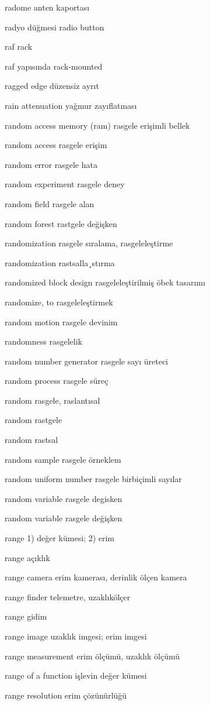 \documentclass[12pt,fleqn]{article}\usepackage{../../common}
\begin{document}
radome anten kaportası

radyo düğmesi radio button

raf rack

raf yapısında rack-mounted

ragged edge düzensiz ayrıt

rain attenuation yağmur zayıflatması

random access memory (ram) rasgele erişimli bellek

random access rasgele erişim

random error rasgele hata

random experiment rasgele deney

random field rasgele alan

random forest rastgele değişken

randomization rasgele sıralama, rasgeleleştirme

randomization rastsalla¸stırma

randomized block design rasgeleleştirilmiş öbek tasarımı

randomize, to rasgeleleştirmek

random motion rasgele devinim

randomness rasgelelik

random number generator rasgele sayı üreteci

random process rasgele süreç

random rasgele, raslantısal

random rastgele

random rastsal

random sample rasgele örneklem

random uniform number rasgele birbiçimli sayılar

random variable rasgele degisken

random variable rasgele değişken

range 1) değer kümesi; 2) erim

range açıklık

range camera erim kamerası, derinlik ölçen kamera

range finder telemetre, uzaklıkölçer

range gidim

range image uzaklık imgesi; erim imgesi

range measurement erim ölçümü, uzaklık ölçümü

range of a function işlevin değer kümesi

range resolution erim çözünürlüğü
\end{document}
